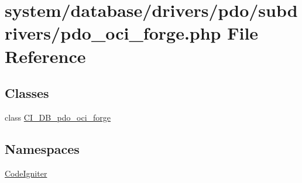 \hypertarget{pdo__oci__forge_8php}{}\section{system/database/drivers/pdo/subdrivers/pdo\+\_\+oci\+\_\+forge.php File Reference}
\label{pdo__oci__forge_8php}
\subsection*{Classes}
\begin{DoxyCompactItemize}
\item 
class \mbox{\hyperlink{class_c_i___d_b__pdo__oci__forge}{C\+I\+\_\+\+D\+B\+\_\+pdo\+\_\+oci\+\_\+forge}}
\end{DoxyCompactItemize}
\subsection*{Namespaces}
\begin{DoxyCompactItemize}
\item 
 \mbox{\hyperlink{namespace_code_igniter}{Code\+Igniter}}
\end{DoxyCompactItemize}
